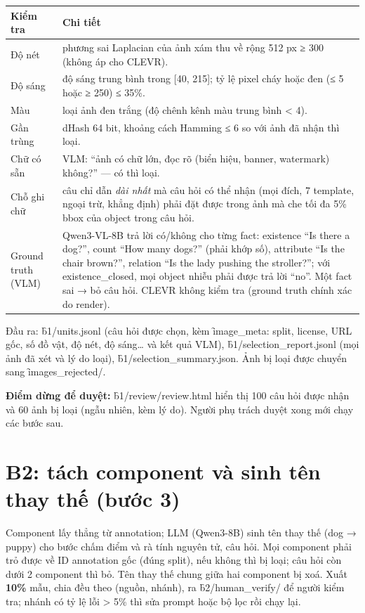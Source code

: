 \documentclass[10.5pt]{article}
\begin{document}
\begin{longtable}{p{3.2cm}p{12.8cm}}
\toprule
\textbf{Kiểm tra} & \textbf{Chi tiết}\\
\midrule
Độ nét & phương sai Laplacian của ảnh xám thu về rộng 512 px ≥ 300 (không áp cho CLEVR).\\
Độ sáng & độ sáng trung bình trong [40, 215]; tỷ lệ pixel cháy hoặc đen (≤ 5 hoặc ≥ 250) ≤ 35\%.\\
Màu & loại ảnh đen trắng (độ chênh kênh màu trung bình < 4).\\
Gần trùng & dHash 64 bit, khoảng cách Hamming ≤ 6 so với ảnh đã nhận thì loại.\\
Chữ có sẵn & VLM: ``ảnh có chữ lớn, đọc rõ (biển hiệu, banner, watermark) không?'' --- có thì loại.\\
Chỗ ghi chữ & câu chỉ dẫn \emph{dài nhất} mà câu hỏi có thể nhận (mọi đích, 7 template, ngoại trừ, khẳng định)
  phải đặt được trong ảnh mà che tối đa 5\% bbox của object trong câu hỏi.\\
Ground truth (VLM) & Qwen3-VL-8B trả lời có/không cho từng fact: existence ``Is there a dog?'', count ``How many
  dogs?'' (phải khớp số), attribute ``Is the chair brown?'', relation ``Is the lady pushing the stroller?'';
  với existence\_closed, mọi object nhiễu phải được trả lời ``no''. Một fact sai → bỏ câu hỏi. CLEVR không
  kiểm tra (ground truth chính xác do render).\\
\bottomrule
\end{longtable}
Đầu ra: \f{b1/units.jsonl} (câu hỏi được chọn, kèm \f{image\_meta}: split, license, URL gốc, số đồ vật, độ
nét, độ sáng\dots{} và kết quả VLM), \f{b1/selection\_report.jsonl} (mọi ảnh đã xét và lý do loại),
\f{b1/selection\_summary.json}. Ảnh bị loại được chuyển sang \f{images\_rejected/}.

\textbf{Điểm dừng để duyệt:} \f{b1/review/review.html} hiển thị 100 câu hỏi được nhận và 60 ảnh bị loại
(ngẫu nhiên, kèm lý do). Người phụ trách duyệt xong mới chạy các bước sau.

\section{B2: tách component và sinh tên thay thế (bước 3)}
Component lấy thẳng từ annotation; LLM (Qwen3-8B) sinh tên thay thế (dog → puppy) cho bước chấm điểm và rà
tính nguyên tử, câu hỏi. Mọi component phải trỏ được về ID annotation gốc (đúng split), nếu không thì bị loại;
câu hỏi còn dưới 2 component thì bỏ. Tên thay thế chung giữa hai component bị xoá. Xuất \textbf{10\%} mẫu,
chia đều theo (nguồn, nhánh), ra \f{b2/human\_verify/} để người kiểm tra; nhánh có tỷ lệ lỗi > 5\% thì sửa
prompt hoặc bộ lọc rồi chạy lại.
\end{document}
